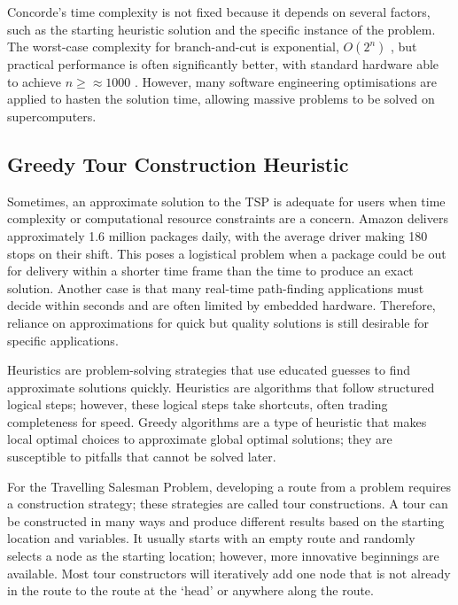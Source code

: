 Concorde's time complexity is not fixed because it depends on several factors, such as the starting heuristic solution and the specific instance of the problem\cite{applegate1998solution}. The worst-case complexity for branch-and-cut is exponential, \(O(2^n)\) \cite{John1963}, but practical performance is often significantly better, with standard hardware able to achieve \(n\geq\approx1000\) \cite{applegate2006traveling}. However, many software engineering optimisations are applied to hasten the solution time, allowing massive problems to be solved on supercomputers.

\subsection{Greedy Tour Construction Heuristic}

Sometimes, an approximate solution to the TSP is adequate for users when time complexity or computational resource constraints are a concern\cite{desale2015heuristic}. Amazon delivers approximately 1.6 million packages daily, with the average driver making 180 stops on their shift. This poses a logistical problem when a package could be out for delivery within a shorter time frame than the time to produce an exact solution. Another case is that many real-time path-finding applications must decide within seconds and are often limited by embedded hardware. Therefore, reliance on approximations for quick but quality solutions is still desirable for specific applications.

Heuristics are problem-solving strategies that use educated guesses to find approximate solutions quickly\cite{kokash2005introduction}. Heuristics are algorithms that follow structured logical steps; however, these logical steps take shortcuts, often trading completeness for speed. Greedy algorithms are a type of heuristic that makes local optimal choices to approximate global optimal solutions\cite{Jungnickel2013}; they are susceptible to pitfalls that cannot be solved later\cite{BANGJENSEN2004121}.

For the Travelling Salesman Problem, developing a route from a problem requires a construction strategy; these strategies are called tour constructions\cite{Christian-tsp}. A tour can be constructed in many ways and produce different results based on the starting location and variables. It usually starts with an empty route and randomly selects a node as the starting location; however, more innovative beginnings are available\cite{Christian-tsp}. Most tour constructors will iteratively add one node that is not already in the route to the route at the `head' or anywhere along the route.

